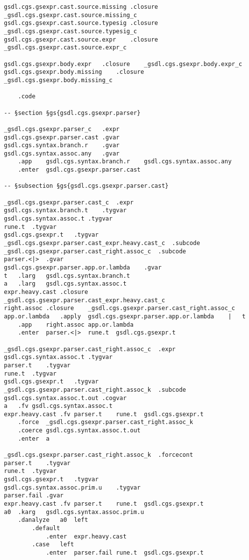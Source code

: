 \documentclass{report}
\begin{document}
\begin{verbatim}
gsdl.cgs.gsexpr.cast.source.missing	.closure	_gsdl.cgs.gsexpr.cast.source.missing_c
gsdl.cgs.gsexpr.cast.source.typesig	.closure	_gsdl.cgs.gsexpr.cast.source.typesig_c
gsdl.cgs.gsexpr.cast.source.expr	.closure	_gsdl.cgs.gsexpr.cast.source.expr_c

gsdl.cgs.gsexpr.body.expr	.closure	_gsdl.cgs.gsexpr.body.expr_c
gsdl.cgs.gsexpr.body.missing	.closure	_gsdl.cgs.gsexpr.body.missing_c

	.code

-- §section §gs{gsdl.cgs.gsexpr.parser}

_gsdl.cgs.gsexpr.parser_c	.expr
gsdl.cgs.gsexpr.parser.cast	.gvar
gsdl.cgs.syntax.branch.r	.gvar
gsdl.cgs.syntax.assoc.any	.gvar
	.app	gsdl.cgs.syntax.branch.r	gsdl.cgs.syntax.assoc.any
	.enter	gsdl.cgs.gsexpr.parser.cast

-- §subsection §gs{gsdl.cgs.gsexpr.parser.cast}

_gsdl.cgs.gsexpr.parser.cast_c	.expr
gsdl.cgs.syntax.branch.t	.tygvar
gsdl.cgs.syntax.assoc.t	.tygvar
rune.t	.tygvar
gsdl.cgs.gsexpr.t	.tygvar
_gsdl.cgs.gsexpr.parser.cast_expr.heavy.cast_c	.subcode
_gsdl.cgs.gsexpr.parser.cast_right.assoc_c	.subcode
parser.<|>	.gvar
gsdl.cgs.gsexpr.parser.app.or.lambda	.gvar
t	.larg	gsdl.cgs.syntax.branch.t
a	.larg	gsdl.cgs.syntax.assoc.t
expr.heavy.cast	.closure	_gsdl.cgs.gsexpr.parser.cast_expr.heavy.cast_c
right.assoc	.closure	_gsdl.cgs.gsexpr.parser.cast_right.assoc_c
app.or.lambda	.apply	gsdl.cgs.gsexpr.parser.app.or.lambda	|	t
	.app	right.assoc	app.or.lambda
	.enter	parser.<|>	rune.t	gsdl.cgs.gsexpr.t

_gsdl.cgs.gsexpr.parser.cast_right.assoc_c	.expr
gsdl.cgs.syntax.assoc.t	.tygvar
parser.t	.tygvar
rune.t	.tygvar
gsdl.cgs.gsexpr.t	.tygvar
_gsdl.cgs.gsexpr.parser.cast_right.assoc_k	.subcode
gsdl.cgs.syntax.assoc.t.out	.cogvar
a	.fv	gsdl.cgs.syntax.assoc.t
expr.heavy.cast	.fv	parser.t	rune.t	gsdl.cgs.gsexpr.t
	.force	_gsdl.cgs.gsexpr.parser.cast_right.assoc_k
	.coerce	gsdl.cgs.syntax.assoc.t.out
	.enter	a

_gsdl.cgs.gsexpr.parser.cast_right.assoc_k	.forcecont
parser.t	.tygvar
rune.t	.tygvar
gsdl.cgs.gsexpr.t	.tygvar
gsdl.cgs.syntax.assoc.prim.u	.tygvar
parser.fail	.gvar
expr.heavy.cast	.fv	parser.t	rune.t	gsdl.cgs.gsexpr.t
a0	.karg	gsdl.cgs.syntax.assoc.prim.u
	.danalyze	a0	left
		.default
			.enter	expr.heavy.cast
		.case	left
			.enter	parser.fail	rune.t	gsdl.cgs.gsexpr.t


\end{verbatim}
\end{document}

